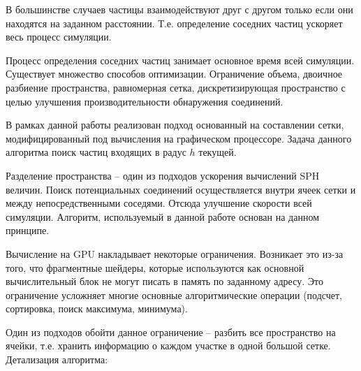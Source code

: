 В большинстве случаев частицы взаимодействуют друг с другом только если они находятся на 
заданном расстоянии. Т.е. определение соседних частиц ускоряет весь процесс симуляции.

Процесс определения соседних частиц занимает основное время всей симуляции. Существует
множество способов оптимизации. Ограничение объема, двоичное разбиение пространства, 
равномерная сетка, дискретизирующая пространство с целью улучшения производительности 
обнаружения соединений.

В рамках данной работы реализован подход основанный на составлении сетки, модифицированный
под вычисления на графическом процессоре. Задача данного алгоритма поиск частиц входящих в 
радус $h$ текущей.

Разделение пространства -- один из подходов ускорения вычислений SPH величин.
Поиск потенциальных соединений осуществляется внутри ячеек сетки и между непосредственными 
соседями. Отсюда улучшение скорости всей симуляции. Алгоритм, используемый в данной работе
основан на данном принципе. 

Вычисление на GPU накладывает некоторые ограничения. Возникает это из-за того, что 
фрагментные шейдеры, которые используются как основной вычислительный блок не могут
писать в память по заданному адресу. Это ограничение усложняет многие основные
алгоритмические операции (подсчет, сортировка, поиск максимума, минимума).  

Один из подходов обойти данное ограничение -- разбить все пространство на ячейки, т.е.
хранить информацию о каждом участке в одной большой сетке.  \\

Детализация алгоритма:

